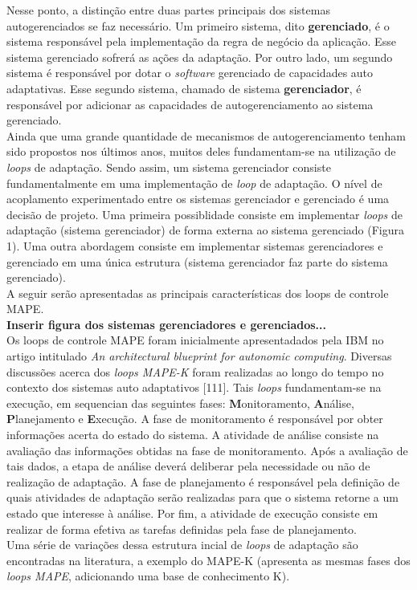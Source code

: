 \documentclass[conference]{IEEEtran}
\begin{document}
Nesse ponto, a distinção entre duas partes principais dos sistemas autogerenciados se faz necessário. Um primeiro sistema, dito \textbf{gerenciado}, é o sistema responsável pela implementação da regra de negócio da aplicação. Esse sistema gerenciado sofrerá as ações da adaptação. Por outro lado, um segundo sistema é responsável por dotar o \textit{software} gerenciado de capacidades auto adaptativas. Esse segundo sistema, chamado de sistema \textbf{gerenciador}, é responsável por adicionar as capacidades de autogerenciamento ao sistema gerenciado.\\ 
Ainda que uma grande quantidade de mecanismos de autogerenciamento tenham sido propostos nos últimos anos, muitos deles fundamentam-se na utilização de \textit{loops} de adaptação. Sendo assim, um sistema gerenciador consiste fundamentalmente em uma implementação de \textit{loop} de adaptação. O nível de acoplamento experimentado entre os sistemas gerenciador e gerenciado é uma decisão de projeto. Uma primeira possiblidade consiste em implementar \textit{loops} de adaptação (sistema gerenciador) de forma externa ao sistema gerenciado (Figura 1). Uma outra abordagem consiste em implementar sistemas gerenciadores e gerenciado em uma única estrutura (sistema gerenciador faz parte do sistema gerenciado).\\
A seguir serão apresentadas as principais características dos loops de controle MAPE.\\
\textbf{Inserir figura dos sistemas gerenciadores e gerenciados...}\\
Os loops de controle MAPE foram inicialmente apresentadados pela IBM no artigo intitulado \textit{An architectural blueprint for autonomic computing}. Diversas discussões acerca dos \textit{loops MAPE-K} foram realizadas ao longo do tempo no contexto dos sistemas auto adaptativos [111]. Tais \textit{loops} fundamentam-se na execução, em sequencian das seguintes fases: \textbf{M}onitoramento, \textbf{A}nálise, \textbf{P}lanejamento e \textbf{E}xecução. A fase de monitoramento é responsável por obter informações acerta do estado do sistema. A atividade de análise consiste na avaliação das informações obtidas na fase de monitoramento. Após a avaliação de tais dados, a etapa de análise deverá deliberar pela necessidade ou não de realização de adaptação. A fase de planejamento é responsável pela definição de quais atividades de adaptação serão realizadas para que o sistema retorne a um estado que interesse à análise. Por fim, a atividade de execução consiste em realizar de forma efetiva as tarefas definidas pela fase de planejamento.\\
Uma série de variações dessa estrutura incial de \textit{loops} de adaptação são encontradas na literatura, a exemplo do MAPE-K (apresenta as mesmas fases dos \textit{loops MAPE}, adicionando uma base de conhecimento K).
\end{document}

